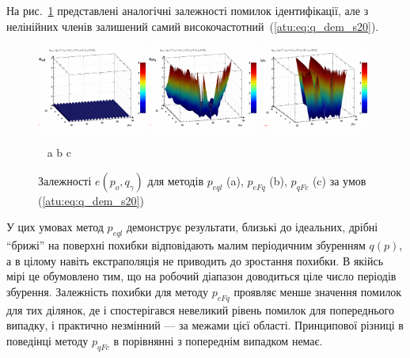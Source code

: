На рис.~\ref{atu:f:qsl_pe_po_qg_s20} представлені аналогічні залежності
помилок ідентифікації, але з нелінійних членів залишений самий
високочастотний~(\ref{atu:eq:q_dem_s20}).

\begin{figure}[htb!]
  \begin{center}
    \includegraphics[width=0.32\textwidth]{p/qls_pe-p_po_qg_eql_s20.png}
    \hfill
    \includegraphics[width=0.32\textwidth]{p/qls_pe-p_po_qg_eFq_s20.png}
    \hfill
    \includegraphics[width=0.32\textwidth]{p/qls_pe-p_po_qg_eFc_s20.png}
  \end{center}
  \vspace{-1.0ex}
  \begin{center}
    ~ \hfill a \hfill\hfill b \hfill\hfill c \hfill ~
  \end{center}
  \vspace{-1.5ex}
  \caption{Залежності $e(p_o,q_\gamma)$ для методів $p_{eql}$ (a), $p_{eFq}$ (b), $p_{qFc}$ (c) за умов (\ref{atu:eq:q_dem_s20})}
  \label{atu:f:qsl_pe_po_qg_s20}
\end{figure}

У цих умовах метод
$ p_{eql} $ демонструє результати, близькі до ідеальних, дрібні
``брижі'' на поверхні похибки відповідають малим періодичним
збуренням
$q(p)$, а в цілому навіть екстраполяція не приводить до зростання
похибки. В якійсь мірі це обумовлено тим, що на робочий діапазон
доводиться ціле число періодів збурення. Залежність похибки
для методу
$ p_{eFq} $ проявляє менше значення помилок для тих ділянок, де
і спостерігався невеликий рівень помилок для попереднього
випадку, і практично незмінний --- за межами цієї
області. Принципової різниці в поведінці методу
$ p_{qFc} $ в порівнянні з попереднім випадком немає.

